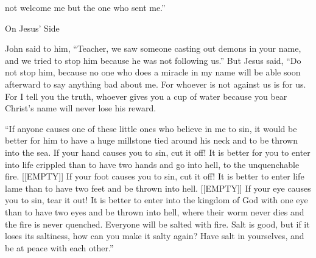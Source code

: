 {not
welcome
me
but
the one who sent
me.”
\par }{\SH On Jesus’ Side
\par }{\PP {}John
said
to him,
“Teacher,
we saw
someone
casting out
demons
in
your
name,
and
we tried to stop
him
because
he was
not
following
us.”
But
Jesus
said,
“Do
not
stop
him,
because
no one
who
does
a miracle
in
my
name
will be able
soon afterward
to say anything bad
about me.
For
whoever
is
not
against
us
is
for
us.
For
I tell
you
the truth,
whoever
gives
you
a cup
of water
because
you bear
Christ’s
name
will
never
lose
his
reward.
\par }{\PP {}“If anyone
causes
one
of these
little
ones who believe
in me to sin, it would be
better
for him
to have a huge millstone
tied
around
his
neck
and
to be thrown
into
the sea.
If
your
hand
causes
you
to sin,
cut
it
off! It is
better
for you
to enter
into
life
crippled
than
to have
two
hands
and go
into
hell,
to
the unquenchable
fire.
[[EMPTY]]
If
your
foot
causes
you
to sin,
cut
it
off! It is
better
to enter
life
lame
than
to have
two
feet
and be thrown
into
hell.
[[EMPTY]]
If
your
eye
causes
you
to sin,
tear
it
out! It is
better
to enter
into
the kingdom
of God
with one eye
than
to have
two
eyes
and be thrown
into
hell,
where
their
worm
never
dies
and
the fire
is
never
quenched.
Everyone
will be salted
with fire.
Salt
is good,
but
if
it loses its saltiness,
how can
you make
it
salty
again? Have
salt
in
yourselves,
and
be at peace
with
each other.”

}
